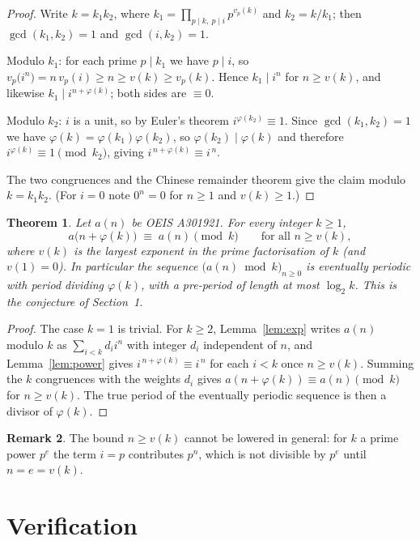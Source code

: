 \documentclass[11pt,a4paper]{article}
\theoremstyle{plain}
\newtheorem{theorem}{Theorem}
\theoremstyle{definition}
\newtheorem{remark}[theorem]{Remark}
\begin{document}
\begin{proof}
Write $k=k_1k_2$, where $k_1=\prod_{p\mid k,\ p\mid i}p^{v_p(k)}$ and $k_2=k/k_1$; then
$\gcd(k_1,k_2)=1$ and $\gcd(i,k_2)=1$.

Modulo $k_1$: for each prime $p\mid k_1$ we have $p\mid i$, so
$v_p\bigl(i^{n}\bigr)=n\,v_p(i)\ge n\ge v(k)\ge v_p(k)$. Hence $k_1\mid i^{n}$ for
$n\ge v(k)$, and likewise $k_1\mid i^{n+\varphi(k)}$; both sides are $\equiv 0$.

Modulo $k_2$: $i$ is a unit, so by Euler's theorem $i^{\varphi(k_2)}\equiv 1$. Since
$\gcd(k_1,k_2)=1$ we have $\varphi(k)=\varphi(k_1)\varphi(k_2)$, so
$\varphi(k_2)\mid\varphi(k)$ and therefore $i^{\varphi(k)}\equiv 1 \pmod{k_2}$, giving
$i^{\,n+\varphi(k)}\equiv i^{\,n}$.

The two congruences and the Chinese remainder theorem give the claim modulo $k=k_1k_2$.
(For $i=0$ note $0^{n}=0$ for $n\ge 1$ and $v(k)\ge1$.)
\end{proof}

\begin{theorem}\label{thm:main}
Let $a(n)$ be OEIS A301921. For every integer $k\ge1$,
\[
a\bigl(n+\varphi(k)\bigr)\;\equiv\;a(n)\pmod{k}\qquad\text{for all } n\ge v(k),
\]
where $v(k)$ is the largest exponent in the prime factorisation of $k$ (and $v(1)=0$).
In particular the sequence $\bigl(a(n)\bmod k\bigr)_{n\ge0}$ is eventually periodic with
period dividing $\varphi(k)$, with a pre-period of length at most $\log_2 k$. This is the
conjecture of Section~1.
\end{theorem}

\begin{proof}
The case $k=1$ is trivial. For $k\ge2$, Lemma~\ref{lem:exp} writes $a(n)$ modulo $k$ as
$\sum_{i<k}d_i i^{n}$ with integer $d_i$ independent of $n$, and Lemma~\ref{lem:power}
gives $i^{\,n+\varphi(k)}\equiv i^{\,n}$ for each $i<k$ once $n\ge v(k)$. Summing the
$k$ congruences with the weights $d_i$ gives
$a(n+\varphi(k))\equiv a(n)\pmod k$ for $n\ge v(k)$. The true period of the eventually
periodic sequence is then a divisor of $\varphi(k)$.
\end{proof}

\begin{remark}
The bound $n\ge v(k)$ cannot be lowered in general: for $k$ a prime power $p^{e}$ the
term $i=p$ contributes $p^{n}$, which is not divisible by $p^{e}$ until $n=e=v(k)$.
\end{remark}

\section{Verification}
\end{document}
